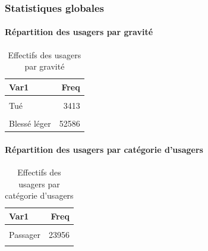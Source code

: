 \documentclass[french,]{tp}
\let\oldparagraph\paragraph
\renewcommand{\paragraph}[1]{\oldparagraph{#1}\mbox{}}
\begin{document}
\hypertarget{statistiques-globales}{%
\subsubsection{Statistiques globales}\label{statistiques-globales}}

\hypertarget{ruxe9partition-des-usagers-par-gravituxe9}{%
\paragraph{Répartition des usagers par gravité}\label{ruxe9partition-des-usagers-par-gravituxe9}}



\begin{table}[H]

\caption{\label{tab:tablegrav}Effectifs des usagers par gravité}
\centering
\begin{tabular}[t]{lr}
\toprule
\textbf{Var1} & \textbf{Freq}\\
\midrule
\cellcolor{gray!6}{Indemne} & \cellcolor{gray!6}{54529}\\
Tué & 3413\\
\cellcolor{gray!6}{Blessé hospitalisé} & \cellcolor{gray!6}{20329}\\
Blessé léger & 52586\\
\bottomrule
\end{tabular}
\end{table}

\hypertarget{ruxe9partition-des-usagers-par-catuxe9gorie-dusagers}{%
\paragraph{Répartition des usagers par catégorie d'usagers}\label{ruxe9partition-des-usagers-par-catuxe9gorie-dusagers}}



\begin{table}[H]

\caption{\label{tab:tablecatu}Effectifs des usagers par catégorie d'usagers}
\centering
\begin{tabular}[t]{lr}
\toprule
\textbf{Var1} & \textbf{Freq}\\
\midrule
\cellcolor{gray!6}{Conducteur} & \cellcolor{gray!6}{95854}\\
Passager & 23956\\
\cellcolor{gray!6}{Piéton} & \cellcolor{gray!6}{11047}\\
\bottomrule
\end{tabular}
\end{table}
\end{document}
